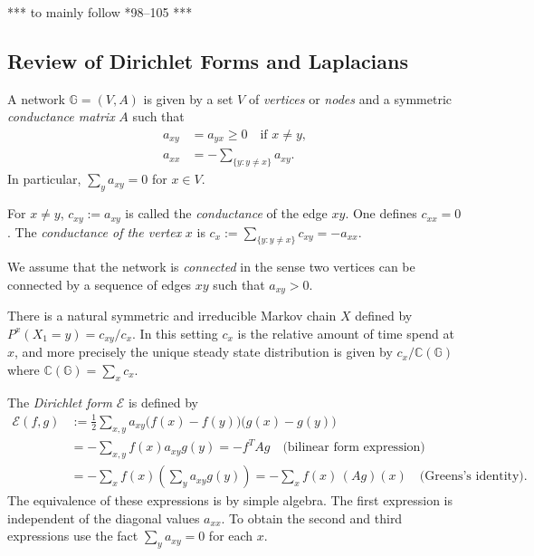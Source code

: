 \documentclass[a4paper]{amsart}
\theoremstyle{plain}
\theoremstyle{definition}
\theoremstyle{remark}
\begin{document}
*** to mainly follow \cite{Bar2}*{98--105} ***

\subsection{Review of Dirichlet Forms and Laplacians}

A network $ \mathbb{G} = (V,A) $ is given by a set $ V $ of \emph{vertices} or \emph{nodes} and a symmetric \emph{conductance matrix} $ A $ such that
\begin{equation} \label{}
\begin{aligned}
a_{xy} &=  a_{yx} \geq 0  \quad \text{if } x\neq y ,\\
a_{xx} &= -\sum_{\{y: y\neq x \}}  a_{xy}.
\end{aligned}
\end{equation} 
In particular, $\sum_y a_{xy}= 0 $ for $ x \in V $. 

For $ x\neq y $, $ c_{xy} := a_{xy} $ is called the \emph{conductance} of the edge $ xy $. One defines  $ c_{xx} = 0 $. 
The \emph{conductance of the vertex} $ x $ is $ c_x := \sum_{\{y: y \neq x \}} c_{xy}=-a_{xx}$.

We assume that the network is \emph{connected} in the sense two vertices can be connected by a sequence of edges $  xy $ such that $ a_{xy} > 0 $.


\bigskip There is a natural symmetric and irreducible Markov chain $ X $ defined by $ P^x(X_1=y) = c_{xy}/c_x $.   In this setting $ c_x $ is the relative amount of time spend at $ x $, and  more precisely the unique steady state distribution is given by $ c_x/\mathbb{C}(\mathbb{G} ) $ where $ \mathbb{C}(\mathbb{G} ) = \sum_x c_x $.  

\bigskip The \emph{Dirichlet form} $ \mathcal{E} $ is defined by 
\begin{equation} \label{defdir2}
\begin{aligned}
\mathcal{E}(f,g) &:= \frac{1}{2} \sum_{x,y} a_{xy} \big(f(x) - f(y)\big)\big (g(x) - g(y)\big)  \\
   &= - \sum_{x,y} f(x) a_{xy} g(y) = - f^TAg \quad \text{(bilinear form expression)} \\ 
   &= -\sum_x f(x) \left(\sum_y a_{xy}g(y) \right) = -\sum_x f(x)\, (Ag)(x) \quad \text{(Greens's identity)}.
   \end{aligned} 
   \end{equation} 
The equivalence of these expressions is by  simple algebra.  The first expression is independent of the diagonal values $ a_{xx} $.  To obtain the second and third expressions use the fact    $\sum_y a_{xy}= 0 $ for each $ x $.
\end{document}

